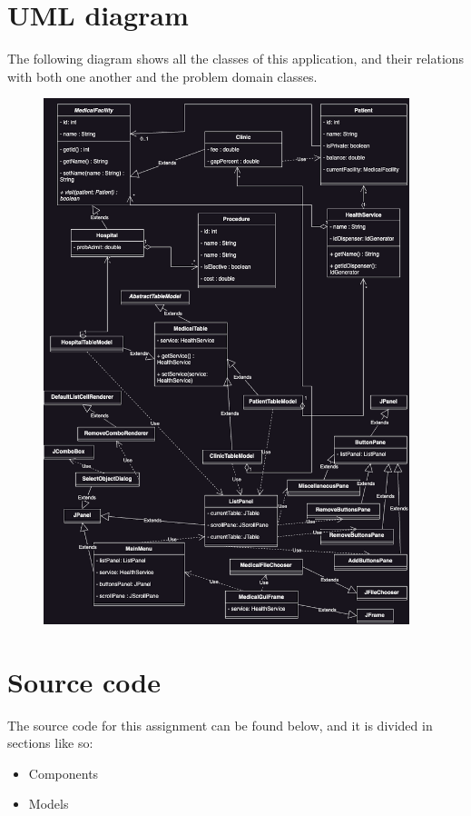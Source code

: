 \documentclass{article}
\begin{document}
\section{UML diagram}
The following diagram shows all the classes of this application, and their relations with both one another and the problem domain classes.
\begin{figure}[ht]
  \begin{center}
    \includegraphics[width=0.95\textwidth]{figures/UML_diagram.png}
  \end{center}
\end{figure}

\newpage

\section{Source code}%
\label{sec:source_code}
The source code for this assignment can be found below, and it is divided in sections like so:
\begin{itemize}
  \item Components
  \item Models
\end{itemize}
\end{document}
